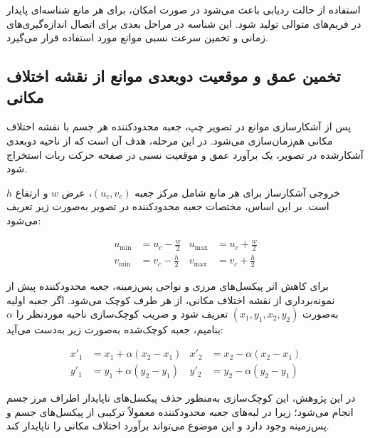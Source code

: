 استفاده از حالت ردیابی باعث می‌شود در صورت امکان، برای هر مانع شناسه‌ای پایدار در فریم‌های متوالی تولید شود. این شناسه در مراحل بعدی برای اتصال اندازه‌گیری‌های زمانی و تخمین سرعت نسبی موانع مورد استفاده قرار می‌گیرد.

\subsection{تخمین عمق و موقعیت دوبعدی موانع از نقشه اختلاف مکانی}
\label{subsec:obstacle_depth_position}

پس از آشکارسازی موانع در تصویر چپ، جعبه محدودکننده هر جسم با نقشه اختلاف مکانی هم‌زمان‌سازی می‌شود. در این مرحله، هدف آن است که از ناحیه دوبعدی آشکارشده در تصویر، یک برآورد عمق و موقعیت نسبی در صفحه حرکت ربات استخراج شود.

خروجی آشکارساز برای هر مانع شامل مرکز جعبه \((u_c,v_c)\)، عرض \(w\) و ارتفاع \(h\) است. بر این اساس، مختصات جعبه محدودکننده در تصویر به‌صورت زیر تعریف می‌شود:

\begin{equation}
	\begin{aligned}
		u_{\min} &= u_c - \frac{w}{2} &
		u_{\max} &= u_c + \frac{w}{2} \\
		v_{\min} &= v_c - \frac{h}{2} &
		v_{\max} &= v_c + \frac{h}{2}
	\end{aligned}
	\label{eq:bbox_limits}
\end{equation}

برای کاهش اثر پیکسل‌های مرزی و نواحی پس‌زمینه، جعبه محدودکننده پیش از نمونه‌برداری از نقشه اختلاف مکانی، از هر طرف کوچک می‌شود. اگر جعبه اولیه به‌صورت \((x_1,y_1,x_2,y_2)\) تعریف شود و ضریب کوچک‌سازی ناحیه موردنظر را \(\alpha\) بنامیم، جعبه کوچک‌شده به‌صورت زیر به‌دست می‌آید:

\begin{equation}
	\begin{aligned}
		x'_1 &= x_1 + \alpha(x_2-x_1) &
		x'_2 &= x_2 - \alpha(x_2-x_1) \\
		y'_1 &= y_1 + \alpha(y_2-y_1) &
		y'_2 &= y_2 - \alpha(y_2-y_1)
	\end{aligned}
	\label{eq:roi_shrink}
\end{equation}

در این پژوهش، این کوچک‌سازی به‌منظور حذف پیکسل‌های ناپایدار اطراف مرز جسم انجام می‌شود؛ زیرا در لبه‌های جعبه محدودکننده معمولاً ترکیبی از پیکسل‌های جسم و پس‌زمینه وجود دارد و این موضوع می‌تواند برآورد اختلاف مکانی را ناپایدار کند.

